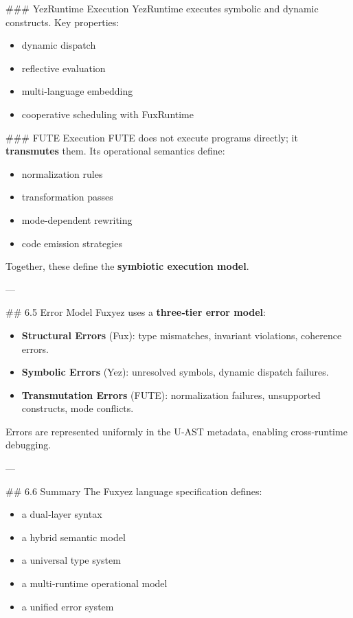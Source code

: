 \#\#\# YezRuntime Execution  
YezRuntime executes symbolic and dynamic constructs.  
Key properties:  
\begin{itemize}
  \item dynamic dispatch  
  \item reflective evaluation  
  \item multi‑language embedding  
  \item cooperative scheduling with FuxRuntime
\end{itemize}

\#\#\# FUTE Execution  
FUTE does not execute programs directly; it \textbf{transmutes} them.  
Its operational semantics define:  
\begin{itemize}
  \item normalization rules  
  \item transformation passes  
  \item mode‑dependent rewriting  
  \item code emission strategies
\end{itemize}

Together, these define the \textbf{symbiotic execution model}.

---

\#\# 6.5 Error Model  
Fuxyez uses a \textbf{three‑tier error model}:

\begin{itemize}
  \item \textbf{Structural Errors} (Fux): type mismatches, invariant violations, coherence errors.  
  \item \textbf{Symbolic Errors} (Yez): unresolved symbols, dynamic dispatch failures.  
  \item \textbf{Transmutation Errors} (FUTE): normalization failures, unsupported constructs, mode conflicts.
\end{itemize}

Errors are represented uniformly in the U‑AST metadata, enabling cross‑runtime debugging.

---

\#\# 6.6 Summary  
The Fuxyez language specification defines:  
\begin{itemize}
  \item a dual‑layer syntax  
  \item a hybrid semantic model  
  \item a universal type system  
  \item a multi‑runtime operational model  
  \item a unified error system  
\end{itemize}

